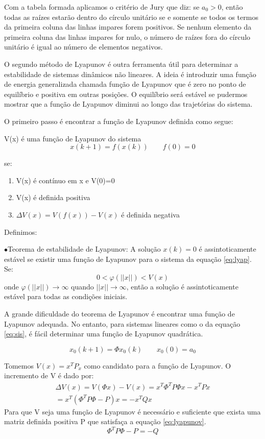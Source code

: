 Com a tabela formada aplicamos o critério de Jury que diz: se $a_0>0$, então todas as raízes estarão dentro do círculo unitário se e somente se todos os termos da primeira coluna das linhas impares forem positivos. Se nenhum elemento da primeira coluna das linhas impares for nulo, o número  de raízes fora do círculo unitário é igual ao número de elementos negativos.

O segundo método de Lyapunov é outra ferramenta útil para determinar a estabilidade de sistemas dinâmicos não lineares. A ideia é introduzir uma função de energia generalizada chamada função de Lyapunov que é zero no ponto de equilíbrio e positiva em outras posições. O equilíbrio será estável se pudermos mostrar que a função de Lyapunov diminui ao longo das trajetórias do sistema.


O primeiro passo é encontrar a função de Lyapunov definida como segue:


V(x) é uma função de Lyapunov do sistema
\begin{equation}\label{eq:lyap}
x(k+1)=f(x(k)) \qquad f(0)=0
\end{equation}

se:
\begin{enumerate}
	\item V(x) é contínuo em x e V(0)=0
	\item V(x) é definida positiva
	\item $\Delta V(x)=V(f(x))-V(x)$ é definida negativa
\end{enumerate}

Definimos:


$\bullet$Teorema de estabilidade de Lyapunov: A solução $x(k)=0$ é assintoticamente estável se existir uma função de Lyapunov para o sistema da equação \eqref{eq:lyap}. Se:
\begin{equation}
0<\varphi(||x||)<V(x)
\end{equation}
onde $\varphi(||x||)\to \infty$ quando $||x|| \to \infty$, então a solução é assintoticamente estável para todas as condições iniciais.


A grande dificuldade do teorema de Lyapunov é encontrar uma função de Lyapunov adequada. No entanto, para sistemas lineares como o da equação \eqref{eq:sis}, é fácil determinar uma função de Lyapunov quadrática.

\begin{equation} \label{eq:sis}
x_0(k+1)=\Phi x_0(k) \qquad x_0(0)=a_0
\end{equation}

Tomemos $V(x)=x^TP_x$ como candidato para a função de Lyapunov. O incremento de V é dado por:
\begin{equation}
\begin{array}{c}
\Delta V(x)=V(\Phi x)-V(x)=x^T\Phi ^T P \Phi x-x^TPx\\
=x^T(\Phi ^T P \Phi -P)x=-x^TQx
\end{array}
\end{equation}
Para que V seja uma função de Lyapunov é necessário e suficiente que exista uma matriz definida positiva P que satisfaça a equação \eqref{eq:lyapunov}.
\begin{equation}\label{eq:lyapunov}
\Phi ^T P \Phi - P= -Q
\end{equation}

